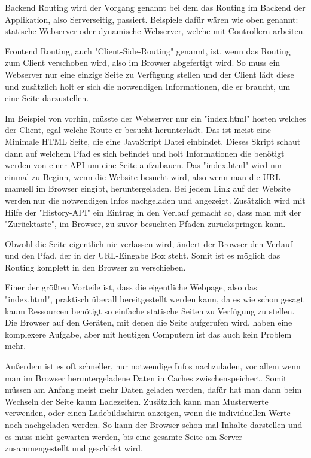 
Backend Routing wird der Vorgang genannt bei dem das Routing im Backend der Applikation, also Serverseitig, passiert. Beispiele dafür wären wie oben genannt: statische Webserver oder dynamische Webserver, welche mit Controllern arbeiten.


Frontend Routing, auch "Client-Side-Routing" genannt, ist, wenn das Routing zum Client verschoben wird, also im Browser abgefertigt wird. So muss ein Webserver nur eine einzige Seite zu Verfügung stellen und der Client lädt diese und zusätzlich holt er sich die notwendigen Informationen, die er braucht, um eine Seite darzustellen.

Im Beispiel von vorhin, müsste der Webserver nur ein "index.html" hosten welches der Client, egal welche Route er besucht herunterlädt. Das ist meist eine Minimale HTML Seite, die eine JavaScript Datei einbindet. Dieses Skript schaut dann auf welchem Pfad es sich befindet und holt Informationen die benötigt werden von einer API um eine Seite aufzubauen. Das "index.html" wird nur einmal zu Beginn, wenn die Website besucht wird, also wenn man die URL manuell im Browser eingibt, heruntergeladen. Bei jedem Link auf der Website werden nur die notwendigen Infos nachgeladen und angezeigt. Zusätzlich wird mit Hilfe der "History-API" ein Eintrag in den Verlauf gemacht so, dass man mit der "Zurücktaste", im Browser, zu zuvor besuchten Pfaden zurückspringen kann.

Obwohl die Seite eigentlich nie verlassen wird, ändert der Browser den Verlauf und den Pfad, der in der URL-Eingabe Box steht. Somit ist es möglich das Routing komplett in den Browser zu verschieben.


Einer der größten Vorteile ist, dass die eigentliche Webpage, also das "index.html", praktisch überall bereitgestellt werden kann, da es wie schon gesagt kaum Ressourcen benötigt so einfache statische Seiten zu Verfügung zu stellen. Die Browser auf den Geräten, mit denen die Seite aufgerufen wird, haben eine komplexere Aufgabe, aber mit heutigen Computern ist das auch kein Problem mehr.

Außerdem ist es oft schneller, nur notwendige Infos nachzuladen, vor allem wenn man im Browser heruntergeladene Daten in Caches zwischenspeichert. Somit müssen am Anfang meist mehr Daten geladen werden, dafür hat man dann beim Wechseln der Seite kaum Ladezeiten. Zusätzlich kann man Musterwerte verwenden, oder einen Ladebildschirm anzeigen, wenn die individuellen Werte noch nachgeladen werden. So kann der Browser schon mal Inhalte darstellen und es muss nicht gewarten werden, bis eine gesamte Seite am Server zusammengestellt und geschickt wird.

